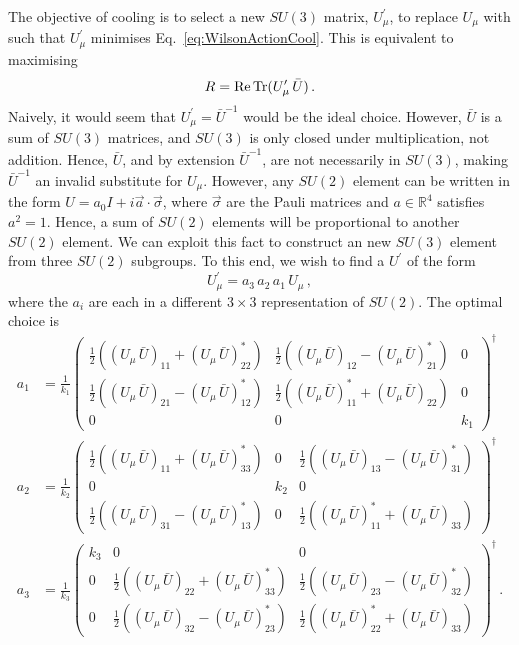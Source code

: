 The objective of cooling is to select a new $SU(3)$ matrix, $U_\mu^\prime$, to replace $U_\mu$ with such that $U_\mu^\prime$ minimises Eq.~\eqref{eq:WilsonActionCool}. This is equivalent to maximising
%
\begin{equation}
R = \operatorname{Re} \operatorname{Tr} (U_\mu^\prime \, \bar{U})\, .
\label{eq:CoolFunctional}
\end{equation}
%
Naively, it would seem that $U_\mu^\prime = \bar{U}^{-1}$ would be the ideal choice. However, $\bar{U}$ is a sum of $SU(3)$ matrices, and $SU(3)$ is only closed under multiplication, not addition. Hence, $\bar{U}$, and by extension $\bar{U}^{-1}$, are not necessarily in $SU(3)$, making $\bar{U}^{-1}$ an invalid substitute for $U_\mu$. However, any $SU(2)$ element can be written in the form $U = a _ { 0 } I + i \vec { a } \cdot \vec { \sigma }$, where $\vec{\sigma}$ are the Pauli matrices and $a\in\mathbb{R}^4$  satisfies $a^2=1$. Hence, a sum of $SU(2)$ elements will be proportional to another $SU(2)$ element. We can exploit this fact to construct an new $SU(3)$ element from three $SU(2)$ subgroups. To this end, we wish to find a $U^\prime$ of the form
%
\begin{equation}
U^\prime_\mu = a_3\,a_2\,a_1\,U_\mu\, ,
\label{eq:UPrime}
\end{equation}
%
where the $a_i$ are each in a different $3\times 3$ representation of $SU(2)$. The optimal choice is
%
\begin{align}
a_1 &= \frac{1}{k_1}
\begin{pmatrix}
\frac{1}{2}\left((U_\mu \, \bar{U})_{11} + (U_\mu \, \bar{U})^*_{22}\right) & \frac{1}{2}\left((U_\mu \, \bar{U})_{12} - (U_\mu \, \bar{U})^*_{21}\right) & 0\\
\frac{1}{2}\left((U_\mu \, \bar{U})_{21} - (U_\mu \, \bar{U})^*_{12}\right) & \frac{1}{2}\left((U_\mu \, \bar{U})^*_{11} + (U_\mu \, \bar{U})_{22}\right) & 0\\
0 & 0 & k_1
\end{pmatrix}^\dagger\\
a_2 &= \frac{1}{k_2}
\begin{pmatrix}
\frac{1}{2}\left((U_\mu \, \bar{U})_{11} + (U_\mu \, \bar{U})^*_{33}\right) & 0 & \frac{1}{2}\left((U_\mu \, \bar{U})_{13} - (U_\mu \, \bar{U})^*_{31}\right)\\
0 & k_2 & 0\\
\frac{1}{2}\left((U_\mu \, \bar{U})_{31} - (U_\mu \, \bar{U})^*_{13}\right) & 0 & \frac{1}{2}\left((U_\mu \, \bar{U})^*_{11} + (U_\mu \, \bar{U})_{33}\right)
\end{pmatrix}^\dagger\\
a_3 &= \frac{1}{k_3}
\begin{pmatrix}
k_3 & 0 & 0\\
0 & \frac{1}{2}\left((U_\mu \, \bar{U})_{22} + (U_\mu \, \bar{U})^*_{33}\right) & \frac{1}{2}\left((U_\mu \, \bar{U})_{23} - (U_\mu \, \bar{U})^*_{32}\right)\\
0 & \frac{1}{2}\left((U_\mu \, \bar{U})_{32} - (U_\mu \, \bar{U})^*_{23}\right) & \frac{1}{2}\left((U_\mu \, \bar{U})^*_{22} + (U_\mu \, \bar{U})_{33}\right)
\end{pmatrix}^\dagger\, .
\end{align}
